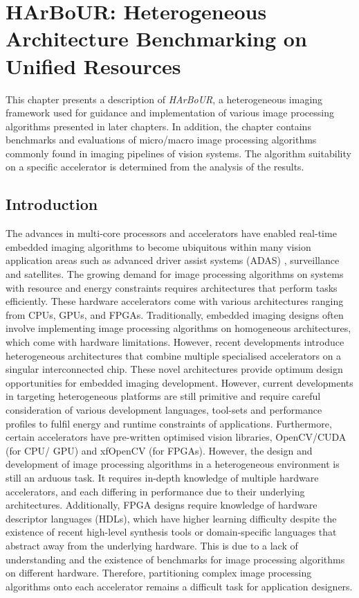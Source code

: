  \chapter{HArBoUR: Heterogeneous Architecture Benchmarking on Unified Resources}\label{Harbour}


This chapter presents a description of \textit{HArBoUR}, a heterogeneous imaging framework used for guidance and implementation of various image processing algorithms presented in later chapters. In addition, the chapter contains benchmarks and evaluations of micro/macro image processing algorithms commonly found in imaging pipelines of vision systems. The algorithm suitability on a specific accelerator is determined from the analysis of the results.

\label{chap:HFrwk}
\section{Introduction}
The advances in multi-core processors and accelerators have enabled real-time embedded imaging algorithms to become ubiquitous within many vision application areas such as advanced driver assist systems (ADAS) \cite{GeiFraCha18}, surveillance\cite{FabBerFra07} and satellites\cite{BruBruHin15}. The growing demand for image processing algorithms on systems with resource and energy constraints requires architectures that perform tasks efficiently. These hardware accelerators come with various architectures ranging from CPUs, GPUs, and FPGAs. Traditionally, embedded imaging designs often involve implementing image processing algorithms on homogeneous architectures, which come with hardware limitations. However, recent developments introduce heterogeneous architectures that combine multiple specialised accelerators on a singular interconnected chip\cite{Xilinx}. These novel architectures provide optimum design opportunities for embedded imaging development. However, current developments in targeting heterogeneous platforms are still primitive and require careful consideration of various development languages, tool-sets and performance profiles to fulfil energy and runtime constraints of applications. Furthermore, certain accelerators have pre-written optimised vision libraries, \eg OpenCV/CUDA (for CPU/ GPU) and xfOpenCV (for FPGAs). However, the design and development of image processing algorithms in a heterogeneous environment is still an arduous task. It requires in-depth knowledge of multiple hardware accelerators, and each differing in performance due to their underlying architectures. Additionally, FPGA designs require knowledge of hardware descriptor languages (HDLs), which have higher learning difficulty despite the existence of recent high-level synthesis tools or domain-specific languages that abstract away from the underlying hardware. This is due to a lack of understanding and the existence of benchmarks for image processing algorithms on different hardware. Therefore, partitioning complex image processing algorithms onto each accelerator remains a difficult task for application designers.

